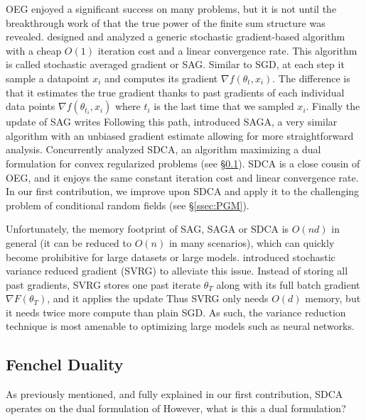 OEG enjoyed a significant success on many problems, but it is not until the breakthrough work of \citet{roux2012stochastic} that the true power of the finite sum structure was revealed.
\citet{roux2012stochastic} designed and analyzed a generic  stochastic gradient-based algorithm with a  cheap $O(1)$ iteration cost and a linear convergence rate.
This algorithm is called stochastic averaged gradient or SAG.
Similar to SGD, at each step it sample a datapoint $x_i$ and computes its gradient $\nabla f(\theta_{t}, x_i)$.
The difference is that it estimates the true gradient thanks to past gradients of each individual data points $\nabla f(\theta_{t_i}, x_i)$ where $t_i$ is the last time that we sampled $x_i$.
Finally the update of SAG writes
Following this path, \citet{defazio2014saga} introduced SAGA, a very similar algorithm with an unbiased gradient estimate allowing for more straightforward analysis.
Concurrently \citet{shalev-shwartz_stochastic_2013} analyzed SDCA, an algorithm maximizing a dual formulation for convex regularized problems (see \S\ref{ssec:fenchel-duality}).
SDCA  is a close cousin of OEG, and it enjoys the same constant iteration cost and linear convergence rate.
In our first contribution, we improve upon SDCA and apply it to the challenging problem of conditional random fields (see \S\ref{ssec:PGM}).

Unfortunately, the memory footprint of SAG, SAGA or SDCA is $O(n d)$ in general (it can be reduced to $O(n)$ in many scenarios), which can quickly become prohibitive for large datasets or large models.
\citet{johnson2013accelerating} introduced stochastic variance reduced gradient (SVRG) to alleviate this issue.
Instead of storing all past gradients, SVRG stores one past iterate $\theta_T$ along with its full batch gradient $\nabla F(\theta_T)$, and it applies the update
Thus SVRG only needs $O(d)$ memory, but it needs twice more compute than plain SGD. As such, the variance reduction technique is most amenable to optimizing large models such as neural networks.

\subsection{Fenchel Duality}
\label{ssec:fenchel-duality}
As previously mentioned, and fully explained in our first contribution, SDCA operates on the dual formulation of
However, what is this a dual formulation?

